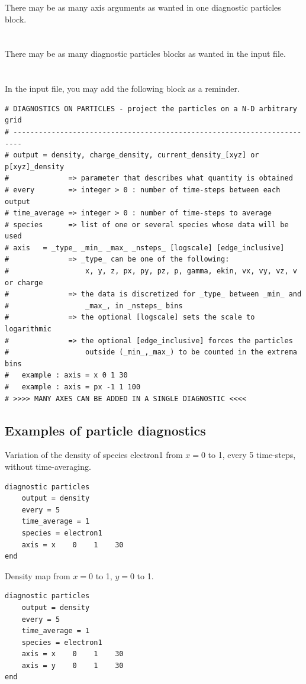 \documentclass[11pt]{article}
\newcommand{\code}[1]{\colorbox{yellow!15}{\ttfamily #1}}
\begin{document}
There may be as many \code{axis} arguments as wanted in one \code{diagnostic particles} block.\\
\\
\\
There may be as many \code{diagnostic particles} blocks as wanted in the input file.\\
\\
\\

In the input file, you may add the following block as a reminder.

\begin{lstlisting}
# DIAGNOSTICS ON PARTICLES - project the particles on a N-D arbitrary grid
# ------------------------------------------------------------------------
# output = density, charge_density, current_density_[xyz] or p[xyz]_density
#              => parameter that describes what quantity is obtained 
# every        => integer > 0 : number of time-steps between each output
# time_average => integer > 0 : number of time-steps to average
# species      => list of one or several species whose data will be used
# axis   = _type_ _min_ _max_ _nsteps_ [logscale] [edge_inclusive]
#              => _type_ can be one of the following:
#                  x, y, z, px, py, pz, p, gamma, ekin, vx, vy, vz, v or charge
#              => the data is discretized for _type_ between _min_ and
#                  _max_, in _nsteps_ bins
#              => the optional [logscale] sets the scale to logarithmic
#              => the optional [edge_inclusive] forces the particles
#                  outside (_min_,_max_) to be counted in the extrema bins
#   example : axis = x 0 1 30
#   example : axis = px -1 1 100 
# >>>> MANY AXES CAN BE ADDED IN A SINGLE DIAGNOSTIC <<<<
\end{lstlisting}


\clearpage
\subsection*{Examples of particle diagnostics}

Variation of the density of species \code{electron1} from $x=0$ to 1, every 5 time-steps, without time-averaging.
\begin{lstlisting}
diagnostic particles
	output = density
	every = 5
	time_average = 1
	species = electron1
	axis = x    0    1    30
end
\end{lstlisting}

Density map from $x=0$ to 1, $y=0$ to 1.
\begin{lstlisting}
diagnostic particles
	output = density
	every = 5
	time_average = 1
	species = electron1
	axis = x    0    1    30
	axis = y    0    1    30
end
\end{lstlisting}
\end{document}
